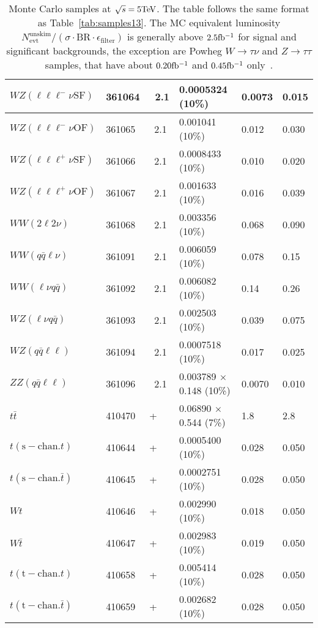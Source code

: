 \begin{table}[htbp]
\begin{center}
\begin{tabular}{l|l|l|l|l|l}
    			$ WZ (\ell\ell\ell^{-}\nu \mathrm{SF}) $ & 361064 & \Sherpa\ 2.1 & 0.0005324 (10\%)  & 0.0073 & 0.015 \\\hline
    			$ WZ (\ell\ell\ell^{-}\nu \mathrm{OF}) $ & 361065 & \Sherpa\ 2.1 & 0.001041 (10\%)  & 0.012 & 0.030 \\\hline
    			$ WZ (\ell\ell\ell^{+}\nu \mathrm{SF}) $ & 361066 & \Sherpa\ 2.1 & 0.0008433 (10\%)  & 0.010 & 0.020 \\\hline
    			$ WZ (\ell\ell\ell^{+}\nu \mathrm{OF}) $ & 361067 & \Sherpa\ 2.1 & 0.001633 (10\%)  & 0.016 & 0.039 \\\hline
    			$ WW (2\ell2\nu) $ & 361068 & \Sherpa\ 2.1 & 0.003356 (10\%)  & 0.068 & 0.090 \\\hline
    			$ WW (q\bar{q}\ell\nu) $ & 361091 & \Sherpa\ 2.1 & 0.006059 (10\%)  & 0.078 & 0.15 \\\hline
    			$ WW (\ell\nu q\bar{q}) $ & 361092 & \Sherpa\ 2.1 & 0.006082 (10\%)  & 0.14 & 0.26 \\\hline
    			$ WZ (\ell\nu q\bar{q}) $ & 361093 & \Sherpa\ 2.1 & 0.002503 (10\%)  & 0.039 & 0.075 \\\hline
    			$ WZ (q\bar{q}\ell\ell) $ & 361094 & \Sherpa\ 2.1 & 0.0007518 (10\%)  & 0.017 & 0.025 \\\hline
    			$ ZZ (q\bar{q}\ell\ell) $ & 361096 & \Sherpa\ 2.1 & 0.003789 $\times$ 0.148 (10\%)  & 0.0070 & 0.010 \\\hline
    			\hline
    			$ t\bar{t} $ & 410470 & \Powheg+\Pythia & 0.06890 $\times$ 0.544 (7\%)  & 1.8 & 2.8 \\\hline
    			$ t (\mathrm{s-chan.} t) $ & 410644 & \Powheg+\Pythia & 0.0005400 (10\%)  & 0.028 & 0.050 \\\hline
    			$ t (\mathrm{s-chan.} \bar{t}) $ & 410645 & \Powheg+\Pythia & 0.0002751 (10\%)  & 0.028 & 0.050 \\\hline
    			$ Wt $ & 410646 & \Powheg+\Pythia & 0.002990 (10\%)  & 0.018 & 0.050 \\\hline
    			$ W\bar{t} $ & 410647 & \Powheg+\Pythia & 0.002983 (10\%)  & 0.019 & 0.050 \\\hline
    			$ t (\mathrm{t-chan.} t) $ & 410658 & \Powheg+\Pythia & 0.005414 (10\%)  & 0.028 & 0.050 \\\hline
    			$ t (\mathrm{t-chan.} \bar{t}) $ & 410659 & \Powheg+\Pythia & 0.002682 (10\%)  & 0.028 & 0.050 \\\hline\hline
    		\end{tabular}
    		\caption{Monte Carlo samples at $\sqrt{s} = 5\text{Te\kern -0.1em V}$. The table
    			follows the same format as Table~\ref{tab:samples13}. The MC equivalent
    			luminosity
    			$N^\mathrm{unskim}_\mathrm{evt}/(\sigma{\cdot}\text{BR}{\cdot}\epsilon_\mathrm{filter})$
    			is generally above $2.5\mbox{fb\(^{-1}\)}$ for signal and significant
    			backgrounds, the exception are Powheg $W\to\tau\nu$ and
    			$Z\to\tau\tau$ samples, that have about $0.20\mbox{fb\(^{-1}\)}$ and $0.45\mbox{fb\(^{-1}\)}$ only~\cite{int_note_samples}.}
    		\label{tab:samples5}
    	\end{center}
    \end{table}
    \clearpage

